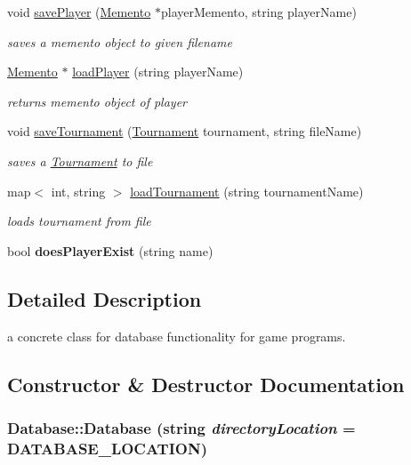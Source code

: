 \begin{DoxyCompactItemize}
\item 
void \hyperlink{classDatabase_a656673898e8f702a1b009c9c74d13b3e}{savePlayer} (\hyperlink{classMemento}{Memento} $\ast$playerMemento, string playerName)
\begin{DoxyCompactList}\small\item\em saves a memento object to given filename \item\end{DoxyCompactList}\item 
\hyperlink{classMemento}{Memento} $\ast$ \hyperlink{classDatabase_a635262537d097df45f6371966d9caefe}{loadPlayer} (string playerName)
\begin{DoxyCompactList}\small\item\em returns memento object of player \item\end{DoxyCompactList}\item 
void \hyperlink{classDatabase_aba5f0b5de3883729e5b0be7cf5b17b8c}{saveTournament} (\hyperlink{classTournament}{Tournament} tournament, string fileName)
\begin{DoxyCompactList}\small\item\em saves a \hyperlink{classTournament}{Tournament} to file \item\end{DoxyCompactList}\item 
map$<$ int, string $>$ \hyperlink{classDatabase_a1b403d4b38ea6c9d2e5d4d4b80f845db}{loadTournament} (string tournamentName)
\begin{DoxyCompactList}\small\item\em loads tournament from file \item\end{DoxyCompactList}\item 
\hypertarget{classDatabase_a96cc3743e82a8906424a74c366240277}{
bool {\bfseries doesPlayerExist} (string name)}
\label{classDatabase_a96cc3743e82a8906424a74c366240277}

\end{DoxyCompactItemize}


\subsection{Detailed Description}
a concrete class for database functionality for game programs. 

\subsection{Constructor \& Destructor Documentation}
\hypertarget{classDatabase_af6c74356771bb4fab7f650c538b69082}{
\subsubsection[{Database}]{\setlength{\rightskip}{0pt plus 5cm}Database::Database (string {\em directoryLocation} = {\ttfamily DATABASE\_\-LOCATION})}}
\label{classDatabase_af6c74356771bb4fab7f650c538b69082}


